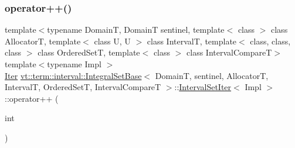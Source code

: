 \subsubsection{\texorpdfstring{operator++()}{operator++()}\hspace{0.1cm}{\footnotesize\ttfamily [2/2]}}
{\footnotesize\ttfamily template$<$typename DomainT, DomainT sentinel, template$<$ class $>$ class AllocatorT, template$<$ class U, U $>$ class IntervalT, template$<$ class, class, class $>$ class Ordered\+SetT, template$<$ class $>$ class Interval\+CompareT$>$ \\
template$<$typename Impl $>$ \\
\hyperlink{structvt_1_1term_1_1interval_1_1_integral_set_base_1_1_interval_set_iter_a4056b2dcca9f60143d2d76387599e6e1}{Iter} \hyperlink{structvt_1_1term_1_1interval_1_1_integral_set_base}{vt\+::term\+::interval\+::\+Integral\+Set\+Base}$<$ DomainT, sentinel, AllocatorT, IntervalT, Ordered\+SetT, Interval\+CompareT $>$\+::\hyperlink{structvt_1_1term_1_1interval_1_1_integral_set_base_1_1_interval_set_iter}{Interval\+Set\+Iter}$<$ Impl $>$\+::operator++ (\begin{DoxyParamCaption}\item[{int}]{ }\end{DoxyParamCaption})\hspace{0.3cm}{\ttfamily [inline]}}

\mbox{\label{structvt_1_1term_1_1interval_1_1_integral_set_base_1_1_interval_set_iter_a74e31386d6c8860fe6c2d2c94472a298}} 

